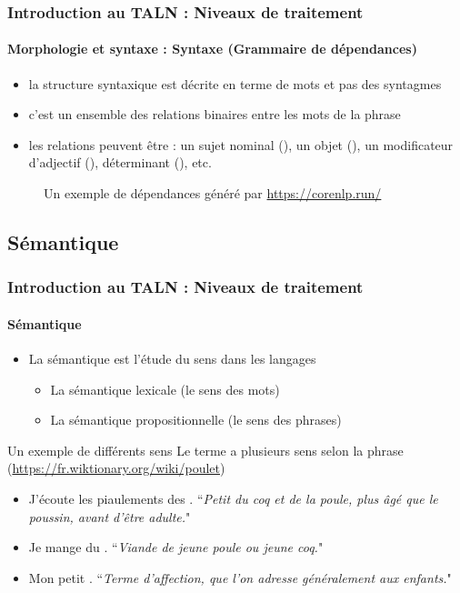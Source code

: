 \documentclass[xcolor=table]{beamer}
\begin{document}
\begin{frame}
\frametitle{Introduction au TALN : Niveaux de traitement}
\framesubtitle{Morphologie et syntaxe : Syntaxe (Grammaire de dépendances)}

\begin{itemize}
	\item la structure syntaxique est décrite en terme de mots et pas des syntagmes
	\item c'est un ensemble des relations binaires entre les mots de la phrase
	\item les relations peuvent être : un sujet nominal (), un objet (), un modificateur d'adjectif (), déterminant (), etc.
\end{itemize}

\begin{figure}
	\caption{Un exemple de dépendances généré par \url{https://corenlp.run/}}
\end{figure}

\end{frame}

\subsection{Sémantique}

\begin{frame}
\frametitle{Introduction au TALN : Niveaux de traitement}
\framesubtitle{Sémantique}

\begin{itemize}
	\item La sémantique est l'étude du sens dans les langages
	\begin{itemize}
		\item La sémantique lexicale (le sens des mots)
		\item La sémantique propositionnelle (le sens des phrases)
	\end{itemize}
\end{itemize}

\begin{exampleblock}{Un exemple de différents sens}
	Le terme  a plusieurs sens selon la phrase (\url{https://fr.wiktionary.org/wiki/poulet})
	\begin{itemize}
		\item J'écoute les piaulements des . ``\textit{Petit du coq et de la poule, plus âgé que le poussin, avant d'être adulte.}"
		\item Je mange du . ``\textit{Viande de jeune poule ou jeune coq.}"
		\item Mon petit . ``\textit{Terme d'affection, que l'on adresse généralement aux enfants.}"
	\end{itemize}
	
\end{exampleblock}

\end{frame}
\end{document}

